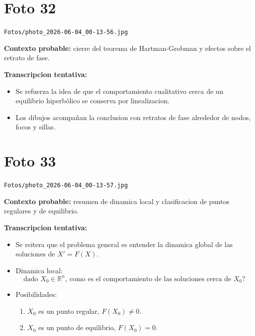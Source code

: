 \documentclass[11pt,letterpaper]{article}
\begin{document}
\section*{Foto 32}
\texttt{Fotos/photo\_2026-06-04\_00-13-56.jpg}

\textbf{Contexto probable:} cierre del teorema de Hartman-Grobman y efectos sobre el retrato de fase.

\textbf{Transcripcion tentativa:}
\begin{itemize}[leftmargin=*]
    \item Se refuerza la idea de que el comportamiento cualitativo cerca de un equilibrio hiperb\'olico se conserva por linealizacion.
    \item Los dibujos acompañan la conclusion con retratos de fase alrededor de nodos, focos y sillas.
\end{itemize}

\section*{Foto 33}
\texttt{Fotos/photo\_2026-06-04\_00-13-57.jpg}

\textbf{Contexto probable:} resumen de dinamica local y clasificacion de puntos regulares y de equilibrio.

\textbf{Transcripcion tentativa:}
\begin{itemize}[leftmargin=*]
    \item Se reitera que el problema general es entender la dinamica global de las soluciones de \(X'=F(X)\).
    \item Dinamica local:
    \[
    \text{dado } X_0\in\mathbb{R}^n,\ \text{como es el comportamiento de las soluciones cerca de }X_0?
    \]
    \item Posibilidades:
    \begin{enumerate}[leftmargin=*]
        \item \(X_0\) es un punto regular, \(F(X_0)\neq 0\).
        \item \(X_0\) es un punto de equilibrio, \(F(X_0)=0\).
    \end{enumerate}
\end{itemize}
\end{document}
